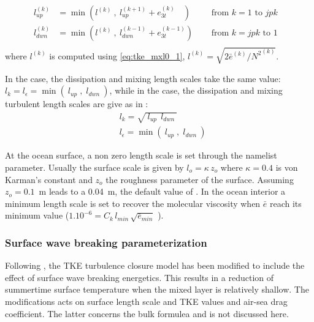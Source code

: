 \documentclass[../main/NEMO_manual]{subfiles}
\begin{document}
\[
  \begin{aligned}
    l_{up\ \ }^{(k)} &= \min \left(  l^{(k)} \ , \ l_{up}^{(k+1)} + e_{3t}^{(k)}\ \ \ \;  \right)
    \quad &\text{ from $k=1$ to $jpk$ }\ \\
    l_{dwn}^{(k)} &= \min \left(  l^{(k)} \ , \ l_{dwn}^{(k-1)} + e_{3t}^{(k-1)}  \right)
    \quad &\text{ from $k=jpk$ to $1$ }\ \\
  \end{aligned}
\]
where $l^{(k)}$ is computed using \autoref{eq:tke_mxl0_1}, \ie $l^{(k)} = \sqrt {2 {\bar e}^{(k)} / {N^2}^{(k)} }$.

In the  case, the dissipation and mixing length scales take the same value:
$ l_k=  l_\epsilon = \min \left(\ l_{up} \;,\;  l_{dwn}\ \right)$, while in the  case,
the dissipation and mixing turbulent length scales are give as in \citet{Gaspar1990}:
\[
  \begin{aligned}
    & l_k          = \sqrt{\  l_{up} \ \ l_{dwn}\ }  	\\
    & l_\epsilon = \min \left(\ l_{up} \;,\;  l_{dwn}\ \right)
  \end{aligned}
\]

At the ocean surface, a non zero length scale is set through the   namelist parameter.
Usually the surface scale is given by $l_o = \kappa \,z_o$ where $\kappa = 0.4$ is von Karman's constant and
$z_o$ the roughness parameter of the surface.
Assuming $z_o=0.1$~m \citep{Craig_Banner_JPO94} leads to a 0.04~m, the default value of .
In the ocean interior a minimum length scale is set to recover the molecular viscosity when
$\bar{e}$ reach its minimum value ($1.10^{-6}= C_k\, l_{min} \,\sqrt{\bar{e}_{min}}$ ).

\subsubsection{Surface wave breaking parameterization}

Following \citet{Mellor_Blumberg_JPO04}, the TKE turbulence closure model has been modified to
include the effect of surface wave breaking energetics.
This results in a reduction of summertime surface temperature when the mixed layer is relatively shallow.
The \citet{Mellor_Blumberg_JPO04} modifications acts on surface length scale and TKE values and
air-sea drag coefficient. 
The latter concerns the bulk formulea and is not discussed here. 
\end{document}
